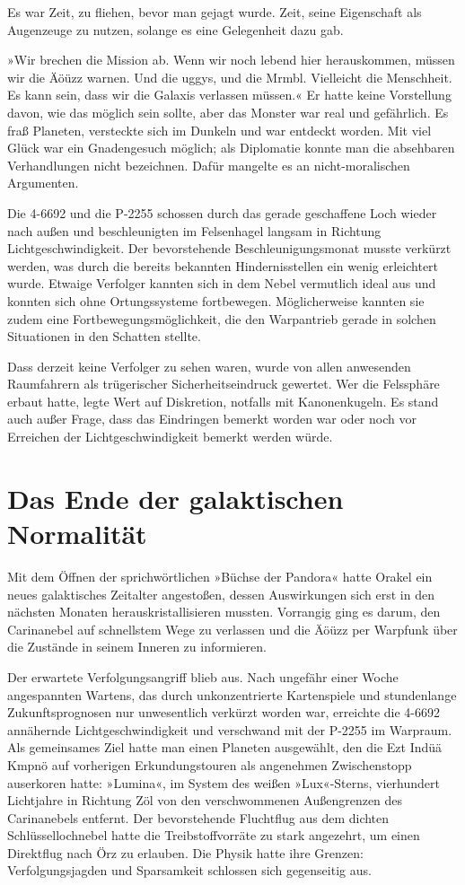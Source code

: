 Es war Zeit, zu fliehen, bevor man gejagt wurde. Zeit, seine Eigenschaft als Augenzeuge zu nutzen, solange es eine Gelegenheit dazu gab.

»Wir brechen die Mission ab. Wenn wir noch lebend hier herauskommen, müssen wir die Äöüzz warnen. Und die uggys, und die Mrmbl. Vielleicht die Menschheit. Es kann sein, dass wir die Galaxis verlassen müssen.« Er hatte keine Vorstellung davon, wie das möglich sein sollte, aber das Monster war real und gefährlich. Es fraß Planeten, versteckte sich im Dunkeln und war entdeckt worden. Mit viel Glück war ein Gnadengesuch möglich; als Diplomatie konnte man die absehbaren Verhandlungen nicht bezeichnen. Dafür mangelte es an nicht-moralischen Argumenten.

Die 4-6692 und die P-2255 schossen durch das gerade geschaffene Loch wieder nach außen und beschleunigten im Felsenhagel langsam in Richtung Lichtgeschwindigkeit. Der bevorstehende Beschleunigungsmonat musste verkürzt werden, was durch die bereits bekannten Hindernisstellen ein wenig erleichtert wurde. Etwaige Verfolger kannten sich in dem Nebel vermutlich ideal aus und konnten sich ohne Ortungssysteme fortbewegen. Möglicherweise kannten sie zudem eine Fortbewegungsmöglichkeit, die den Warpantrieb gerade in solchen Situationen in den Schatten stellte.

Dass derzeit keine Verfolger zu sehen waren, wurde von allen anwesenden Raumfahrern als trügerischer Sicherheitseindruck gewertet. Wer die Felssphäre erbaut hatte, legte Wert auf Diskretion, notfalls mit Kanonenkugeln. Es stand auch außer Frage, dass das Eindringen bemerkt worden war oder noch vor Erreichen der Lichtgeschwindigkeit bemerkt werden würde.


\chapter{Das Ende der galaktischen Normalität}

Mit dem Öffnen der sprichwörtlichen »Büchse der Pandora« hatte Orakel ein neues galaktisches Zeitalter angestoßen, dessen Auswirkungen sich erst in den nächsten Monaten herauskristallisieren mussten. Vorrangig ging es darum, den Carinanebel auf schnellstem Wege zu verlassen und die Äöüzz per Warpfunk über die Zustände in seinem Inneren zu informieren.

Der erwartete Verfolgungsangriff blieb aus. Nach ungefähr einer Woche angespannten Wartens, das durch unkonzentrierte Kartenspiele und stundenlange Zukunftsprognosen nur unwesentlich verkürzt worden war, erreichte die 4-6692 annähernde Lichtgeschwindigkeit und verschwand mit der P-2255 im Warpraum. Als gemeinsames Ziel hatte man einen Planeten ausgewählt, den die Ezt Indüä Kmpnö auf vorherigen Erkundungstouren als angenehmen Zwischenstopp auserkoren hatte: »Lumina«, im System des weißen »Lux«-Sterns, vierhundert Lichtjahre in Richtung Zöl von den verschwommenen Außengrenzen des Carinanebels entfernt. Der bevorstehende Fluchtflug aus dem dichten Schlüssellochnebel hatte die Treibstoffvorräte zu stark angezehrt, um einen Direktflug nach Örz zu erlauben. Die Physik hatte ihre Grenzen: Verfolgungsjagden und Sparsamkeit schlossen sich gegenseitig aus.

